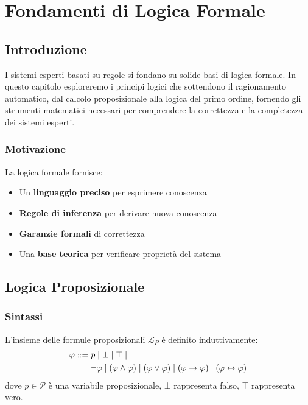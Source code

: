 
\chapter{Fondamenti di Logica Formale}
\label{cap:logica_formale}

\section{Introduzione}

I sistemi esperti basati su regole si fondano su solide basi di logica formale. In questo capitolo esploreremo i principi logici che sottendono il ragionamento automatico, dal calcolo proposizionale alla logica del primo ordine, fornendo gli strumenti matematici necessari per comprendere la correttezza e la completezza dei sistemi esperti.

\subsection{Motivazione}

La logica formale fornisce:
\begin{itemize}
\item Un \textbf{linguaggio preciso} per esprimere conoscenza
\item \textbf{Regole di inferenza} per derivare nuova conoscenza
\item \textbf{Garanzie formali} di correttezza
\item Una \textbf{base teorica} per verificare proprietà del sistema
\end{itemize}

\section{Logica Proposizionale}

\subsection{Sintassi}

\begin{definizione}
L'insieme delle formule proposizionali $\mathcal{L}_P$ è definito induttivamente:
\begin{align}
\varphi ::= &\; p \mid \bot \mid \top \mid \notag \\
            &\; \neg \varphi \mid (\varphi \land \varphi) \mid (\varphi \lor \varphi) \mid (\varphi \rightarrow \varphi) \mid (\varphi \leftrightarrow \varphi)
\end{align}
dove $p \in \mathcal{P}$ è una variabile proposizionale, $\bot$ rappresenta falso, $\top$ rappresenta vero.
\end{definizione}

